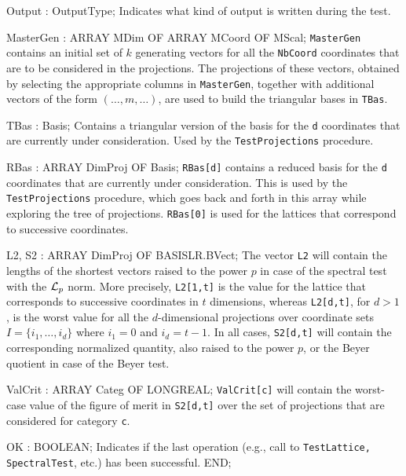      Output        : OutputType;
\endcode
\tabbb
   Indicates what kind of output is written during the test.
\endtabbb
\code

      MasterGen     : ARRAY MDim OF ARRAY MCoord OF MScal;
\endcode
\tabbb
  {\tt MasterGen} contains an initial set of $k$ generating vectors
  for all the {\tt NbCoord} coordinates that are to be considered in the 
  projections.
  The projections of these vectors, obtained by selecting the 
  appropriate columns in {\tt MasterGen}, together with additional vectors
  of the form $(\dots, m, \dots)$, are used to build the triangular
  bases in {\tt TBas}.
\endtabbb
\code

      TBas          : Basis;
\endcode
\tabbb
  Contains a triangular version of the basis
  for the {\tt d} coordinates that are currently under consideration.
  Used by the {\tt TestProjections} procedure.
\endtabbb
\code

      RBas          : ARRAY DimProj OF Basis;
\endcode
\tabbb
  {\tt RBas[d]} contains a reduced basis
  for the {\tt d} coordinates that are currently under consideration.
  This is used by the {\tt TestProjections} procedure, which goes
  back and forth in this array while exploring the tree of projections.
  {\tt RBas[0]} is used for the lattices that correspond to successive
  coordinates.
  
\endtabbb
\code

      L2, S2        : ARRAY DimProj OF BASISLR.BVect;
\endcode
\tabbb
   The vector {\tt L2} will contain the lengths of the shortest vectors 
   raised to the power $p$ in case of the spectral test with the 
   ${\cal L}_p$ norm.  More precisely, {\tt L2[1,t]} is the value for the
   lattice that corresponds to successive coordinates in $t$ dimensions,
   whereas {\tt L2[d,t]}, for $d>1$, is the worst value for all the 
   $d$-dimensional projections over coordinate sets $I = \{i_1,\dots,i_d\}$
   where $i_1=0$ and $i_d=t-1$.  In all cases,   
   {\tt S2[d,t]} will contain the corresponding normalized quantity,
   also raised to the power $p$, or the Beyer quotient in case of the 
   Beyer test.
\endtabbb
\code

      ValCrit : ARRAY Categ OF LONGREAL;
\endcode
\tabbb
   {\tt ValCrit[c]} will contain the worst-case value of the figure 
   of merit in {\tt S2[d,t]} over the set of projections that are considered
   for category {\tt c}.
\endtabbb
\code

      OK : BOOLEAN;
\endcode
\tabb
   Indicates if the last operation (e.g., call to {\tt TestLattice,
   SpectralTest}, etc.) has been successful.
\endtabb
\code
      END;



